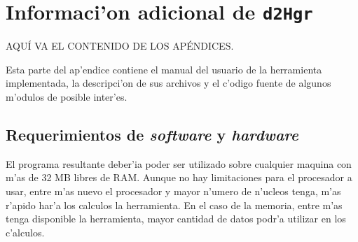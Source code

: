 \chapter{Informaci'on adicional de {\tt d2Hgr}}

AQU\'I VA EL CONTENIDO DE LOS AP\'ENDICES.
\vspace{5 mm}

Esta parte del ap'endice contiene el manual del usuario de la herramienta
implementada, la descripci'on de sus archivos y el c'odigo fuente de algunos
m'odulos de posible inter'es.

\section{Requerimientos de {\it software} y {\it hardware}}
\label{sect:hardsoftrequirements}

El programa resultante deber'ia poder ser utilizado sobre cualquier maquina 
con m'as de 32 MB libres de RAM. Aunque no hay limitaciones para el procesador
a usar, entre m'as nuevo el procesador y mayor n'umero de n'ucleos tenga, m'as
r'apido har'a los calculos la herramienta. En el caso de la memoria, entre 
m'as tenga disponible la herramienta, mayor cantidad de datos podr'a utilizar 
en los c'alculos.


